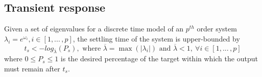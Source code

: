\documentclass[sigconf]{llncs}
\begin{document}
\subsection{Transient response} 
\label{sec:transientspecificationproof}
\begin{theorem}
Given a set of eigenvalues for a discrete time model of an $p^{th}$ order system $\lambda_i =e^{\omega_i}, i \in [1, ...\,,p]$, the settling time of the system is upper-bounded by
\begin{equation}
t_s<-log_{\overline{\lambda}}({P_s}), \text{ where }  \overline{\lambda} = \max(|\lambda_i|) \text{ and } \overline{\lambda}<1,\ \forall i \in [1, ...\,,p]
\label{eq:set_time}
\end{equation}
where $0\leq P_s \leq 1$ is the desired percentage of the target within which the output must remain after $t_s$.
\end{theorem}
\end{document}

